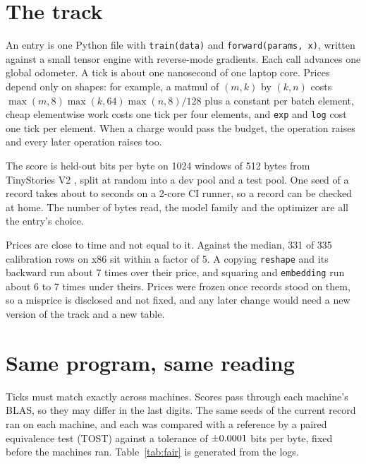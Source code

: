\documentclass[11pt]{article}
\begin{document}
\section{The track}
An entry is one Python file with \texttt{train(data)} and \texttt{forward(params, x)}, written against a small tensor engine with reverse-mode gradients. Each call advances one global odometer. A tick is about one nanosecond of one laptop core. Prices depend only on shapes: for example, a matmul of $(m,k)$ by $(k,n)$ costs $\max(m,8)\max(k,64)\max(n,8)/128$ plus a constant per batch element, cheap elementwise work costs one tick per four elements, and \texttt{exp} and \texttt{log} cost one tick per element. When a charge would pass the budget, the operation raises and every later operation raises too.

The score is held-out bits per byte on 1024 windows of 512 bytes from TinyStories V2 \cite{tinystories}, split at random into a dev pool and a test pool. One seed of a record takes about \vtwolo{} to \vtwohi{} seconds on a 2-core CI runner, so a record can be checked at home. The number of bytes read, the model family and the optimizer are all the entry's choice.

Prices are close to time and not equal to it. Against the median, 331 of 335 calibration rows on x86 sit within a factor of 5. A copying \texttt{reshape} and its backward run about 7 times over their price, and squaring and \texttt{embedding} run about 6 to 7 times under theirs. Prices were frozen once records stood on them, so a misprice is disclosed and not fixed, and any later change would need a new version of the track and a new table.

\section{Same program, same reading}
Ticks must match exactly across machines. Scores pass through each machine's BLAS, so they may differ in the last digits. The same \vfairseeds{} seeds of the current record ran on each machine, and each was compared with a reference by a paired equivalence test (TOST) against a tolerance of $\pm0.0001$ bits per byte, fixed before the machines ran. \vbranchnote{} Table~\ref{tab:fair} is generated from the logs.

\begin{table}[h]\centering\small
\resizebox{\linewidth}{!}{}
\caption{The same seeds of the current record, each machine against the reference (\vfairreference). Ticks are train and eval ticks per byte.}\label{tab:fair}
\end{table}
\end{document}
